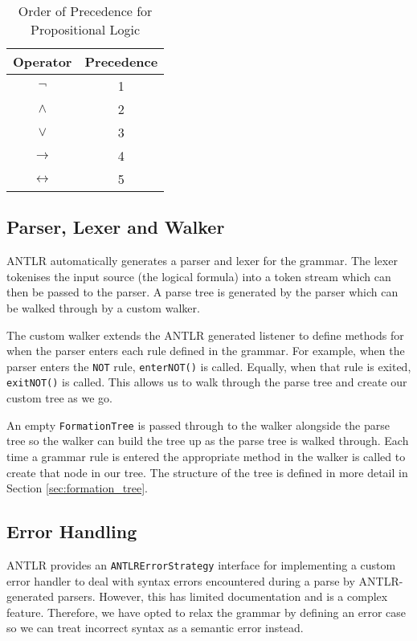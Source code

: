 \documentclass{report}
\begin{document}
\begin{table}[h]
\begin{center}
\begin{tabular}{|| c | c ||}
    \hline
    Operator & Precedence \\ \hline 
    $\lnot$  & 1 \\
    $\land$  & 2 \\
    $\lor$   & 3 \\
    $\to$    & 4 \\
    $\leftrightarrow$ & 5 \\ \hline
\end{tabular}
\caption{Order of Precedence for Propositional Logic}
\label{orderofprecendence}
\end{center}
\end{table}

\subsection{Parser, Lexer and Walker}
\label{sub:walker}

ANTLR automatically generates a parser and lexer for the grammar. The lexer tokenises the input source (the logical formula) into a token stream which can then be passed to the parser. A parse tree is generated by the parser which can be walked through by a custom walker. 

The custom walker extends the ANTLR generated listener to define methods for when the parser enters each rule defined in the grammar. For example, when the parser enters the {\tt NOT} rule, {\tt enterNOT()} is called. Equally, when that rule is exited, {\tt exitNOT()} is called. This allows us to walk through the parse tree and create our custom tree as we go.

An empty {\tt FormationTree} is passed through to the walker alongside the parse tree so the walker can build the tree up as the parse tree is walked through. Each time a grammar rule is entered the appropriate method in the walker is called to create that node in our tree. The structure of the tree is defined in more detail in Section \ref{sec:formation_tree}.

\subsection{Error Handling}
\label{sub:error_handling}

ANTLR provides an {\tt ANTLRErrorStrategy} interface for implementing a custom error handler to deal with syntax errors encountered during a parse by ANTLR-generated parsers. However, this has limited documentation and is a complex feature. Therefore, we have opted to relax the grammar by defining an error case so we can treat incorrect syntax as a semantic error instead.
\end{document}
